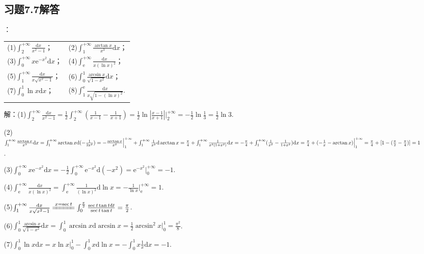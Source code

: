 \documentclass[12pt,UTF8]{ctexart}
\begin{document}
\subsection{习题7.7解答}
\begin{enumerate}
：
\newline
\begin{tabular}{ll}
(1)$\int_2^{+\infty}\frac{\mathrm dx}{x^2-1}$；&(2)$\int_1^{+\infty}\frac{\arctan x}{x^3}\mathrm dx$；\\
(3)$\int_0^{+\infty}x\mathrm e^{-x^2}\mathrm dx$；&(4)$\int_{\mathrm e}^{+\infty}\frac{\mathrm dx}{x(\ln x)^2}$；\\
(5)$\int_1^{+\infty}\frac{\mathrm dx}{x\sqrt{x^2-1}}$；&(6)$\int_0^1\frac{\arcsin x}{\sqrt{1-x^2}}\mathrm dx$；\\
(7)$\int_0^1\ln x\mathrm dx$；&(8)$\int_1^{\mathrm e}\frac{\mathrm dx}{x\sqrt{1-(\ln x)^2}}$.
\end{tabular}

解：(1)$\int_2^{+\infty}\frac{\mathrm dx}{x^2-1}=\frac12\int_2^{+\infty}(\frac1{x-1}-\frac1{x+1})=\frac12\ln|\frac{x-1}{x+1}|\Big|_2^{+\infty}=-\frac12\ln\frac13=\frac12\ln3$.

(2)$\int_1^{+\infty}\frac{\arctan x}{x^3}\mathrm dx=\int_1^{+\infty}\arctan x\mathrm d(-\frac1{2x^2})=-\frac{\arctan x}{x^2}\Big|_1^{+\infty}+\int_1^{+\infty}\frac1{x^2}\mathrm d\arctan x\\
=\frac\pi4+\int_1^{+\infty}\frac1{x^2(1+x^2)}\mathrm dx=-\frac\pi4+\int_1^{+\infty}(\frac1{x^2}-\frac1{1+x^2})\mathrm dx=\frac\pi4+(-\frac1x-\arctan x)\Big|_1^{+\infty}\\
=\frac\pi4+[1-(\frac\pi2-\frac\pi4)]=1$.

(3)$\int_0^{+\infty}x\mathrm e^{-x^2}\mathrm dx=-\frac12\int_0^{+\infty}\mathrm e^{-x^2}\mathrm d(-x^2)=\mathrm e^{-x^2}\Big|_0^{+\infty}=-1$.

(4)$\int_{\mathrm e}^{+\infty}\frac{\mathrm dx}{x(\ln x)^2}=\int_{\mathrm e}^{+\infty}\frac1{(\ln x)^2}\mathrm d\ln x=-\frac1{\ln x}\Big|_{\mathrm e}^{+\infty}=1$.

(5)$\int_1^{+\infty}\frac{\mathrm dx}{x\sqrt{x^2-1}}\xlongequal{x=\sec t}\int_0^{\frac\pi2}\frac{\sec t\tan t\mathrm dt}{\sec t\tan t}=\frac\pi2$.

(6)$\int_0^1\frac{\arcsin x}{\sqrt{1-x^2}}\mathrm dx=\int_0^1\arcsin x\mathrm d\arcsin x=\frac12\arcsin^2x\Big|_0^1=\frac{\pi^2}8$.

(7)$\int_0^1\ln x\mathrm dx=x\ln x\Big|_0^1-\int_0^1x\mathrm d\ln x=-\int_0^1x\frac1x\mathrm dx=-1$.


\end{enumerate}
\end{document}
